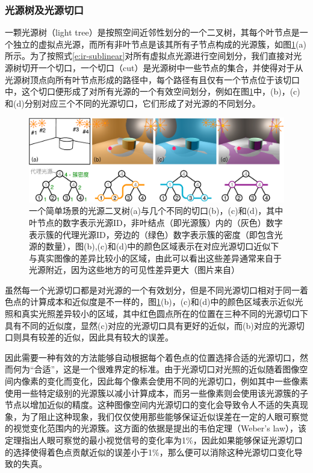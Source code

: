 \subsubsection{光源树及光源切口}
一颗光源树（light tree）是按照空间近邻性划分的一个二叉树，其每个叶节点是一个独立的虚拟点光源，而所有非叶节点是该其所有子节点构成的光源簇，如图\ref{f:ir-lightcuts}(a)所示。为了按照式\ref{e:ir-sublinear}对所有虚拟点光源进行空间划分，我们直接对光源树切开一个切口，一个切口（cut）是光源树中一些节点的集合，并使得对于从光源树顶点向所有叶节点形成的路径中，每个路径有且仅有一个节点位于该切口中，这个切口便形成了对所有光源的一个有效空间划分，例如在图\ref{f:ir-lightcuts}中，(b)，(c)和(d)分别对应三个不同的光源切口，它们形成了对光源的不同划分。

\begin{figure}
\begin{fullwidth}
	\includegraphics[width=1.0\thewidth]{figures/ir/lightcuts}
	\caption{一个简单场景的光源二叉树(a)与几个不同的切口(b)，(c)和(d)，其中叶节点的数字表示光源ID，非叶结点（即光源簇）内的（灰色）数字表示簇的代理光源ID，旁边的（绿色）数字表示簇的密度（即包含光源的数量），图(b),(c)和(d)中的颜色区域表示在对应光源切口近似下与真实图像的差异比较小的区域，由此可以看出这些差异通常来自于光源附近，因为这些地方的可见性差异更大（图片来自\cite{a:Lightcuts:AScalableApproachtoIllumination}）}
	\label{f:ir-lightcuts}
\end{fullwidth}
\end{figure}

虽然每一个光源切口都是对光源的一个有效划分，但是不同光源切口相对于同一着色点的计算成本和近似度是不一样的，图\ref{f:ir-lightcuts}(b)，(c)和(d)中的颜色区域表示近似光照和真实光照差异较小的区域，其中红色圆点所在的位置在三种不同的光源切口下具有不同的近似度，显然(c)对应的光源切口具有更好的近似，而(b)对应的光源切口则具有较差的近似，因此具有较大的误差。

因此需要一种有效的方法能够自动根据每个着色点的位置选择合适的光源切口，然而何为“合适”，这是一个很难界定的标准。由于光源切口对光照的近似随着图像空间内像素的变化而变化，因此每个像素会使用不同的光源切口，例如其中一些像素使用一些特定级别的光源簇以减小计算成本，而另一些像素则会使用该光源簇的子节点以增加近似的精度。这种图像空间内光源切口的变化会导致令人不适的失真现象，为了阻止这种现象，我们仅仅使用那些能够保证近似误差在一定的人眼可察觉的视觉变化范围内的光源簇。这方面的依据是\cite{a:Luminancedifferencethresholds}提出的韦伯定理（Weber’s law），该定理指出人眼可察觉的最小视觉信号的变化率为1\%，因此如果能够保证光源切口的选择使得着色点贡献近似的误差小于1\%，那么便可以消除这种光源切口变化导致的失真。





